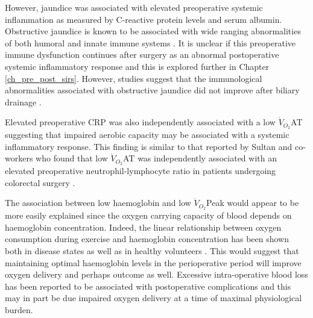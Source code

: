 
However, jaundice was associated with elevated preoperative systemic inflammation as measured by C-reactive protein levels and serum albumin. 
Obstructive jaundice is known to be associated with wide ranging abnormalities of both humoral and innate immune systems \parencite{nehez_compromise_2002, padillo_cytokines_2001, scott-conner_pathophysiology_1994}. 
It is unclear if this preoperative immune dysfunction continues after surgery as an abnormal postoperative systemic inflammatory response and this is explored further in Chapter \ref{ch_pre_post_sirs}.
However, studies suggest that the immunological abnormalities associated with obstructive jaundice did not improve after biliary drainage \parencite{kimmings_endotoxin_2000}.

Elevated preoperative CRP was also independently associated with a low $\dot{V}_{O_2}$AT suggesting that impaired aerobic capacity may be associated with a systemic inflammatory response.
This finding is similar to that reported by Sultan and co-workers who found that low $\dot{V}_{O_2}$AT was independently associated with an elevated preoperative neutrophil-lymphocyte ratio in patients undergoing colorectal surgery \parencite{sultan_cardiopulmonary_2014}.

The association between low haemoglobin and low $\dot{V}_{O_2}$Peak would appear to be more easily explained since the oxygen carrying capacity of blood depends on haemoglobin concentration.  
Indeed, the linear relationship between oxygen consumption during exercise and haemoglobin concentration has been shown both in disease states \parencite{agostoni_relationship_2010} as well as in healthy volunteers \parencite{dellweg_cardiopulmonary_2008}.
This would suggest that maintaining optimal haemoglobin levels in the perioperative period will improve oxygen delivery and perhaps outcome as well. 
Excessive intra-operative blood loss has been reported to be associated with postoperative complications \parencite{pratt_risk_2008} and this may in part be due impaired oxygen delivery at a time of maximal physiological burden.

